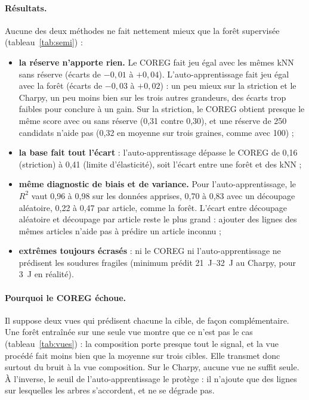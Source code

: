 \paragraph{Résultats.} Aucune des deux méthodes ne fait nettement mieux que la forêt
supervisée (tableau~\ref{tab:semi}) :
\begin{itemize}
  \item \textbf{la réserve n'apporte rien.} Le COREG fait jeu égal avec les mêmes kNN sans
    réserve (écarts de $-0{,}01$ à $+0{,}04$). L'auto-apprentissage fait jeu égal avec
    la forêt (écarts de $-0{,}03$ à $+0{,}02$) : un peu mieux sur la striction et le
    Charpy, un peu moins bien sur les trois autres grandeurs, des écarts trop faibles pour
    conclure à un gain. Sur la striction, le COREG obtient presque le même score avec ou
    sans réserve (0,31 contre 0,30), et une réserve de 250 candidats n'aide pas (0,32 en
    moyenne sur trois graines, comme avec 100) ;
  \item \textbf{la base fait tout l'écart} : l'auto-apprentissage dépasse le COREG de
    0,16 (striction) à 0,41 (limite d'élasticité), soit l'écart entre une forêt et des
    kNN ;
  \item \textbf{même diagnostic de biais et de variance.} Pour l'auto-apprentissage, le
    $R^2$ vaut 0,96 à 0,98 sur les données apprises, 0,70 à 0,83 avec un découpage
    aléatoire, 0,22 à 0,47 par article, comme la forêt. L'écart entre découpage aléatoire
    et découpage par article reste le plus grand : ajouter des lignes des mêmes articles
    n'aide pas à prédire un article inconnu ;
  \item \textbf{extrêmes toujours écrasés} : ni le COREG ni l'auto-apprentissage ne
    prédisent les soudures fragiles (minimum prédit \SIrange{21}{32}{\joule} au Charpy,
    pour \SI{3}{\joule} en réalité).
\end{itemize}

\paragraph{Pourquoi le COREG échoue.} Il suppose deux vues qui prédisent chacune la cible,
de façon complémentaire. Une forêt entraînée sur une seule vue montre que ce n'est pas le
cas (tableau~\ref{tab:vues}) : la composition porte presque tout le signal, et la vue
procédé fait moins bien que la moyenne sur trois cibles. Elle transmet donc surtout du
bruit à la vue composition. Sur le Charpy, aucune vue ne suffit seule. À l'inverse, le
seuil de l'auto-apprentissage le protège : il n'ajoute que des lignes sur lesquelles les
arbres s'accordent, et ne se dégrade pas.

